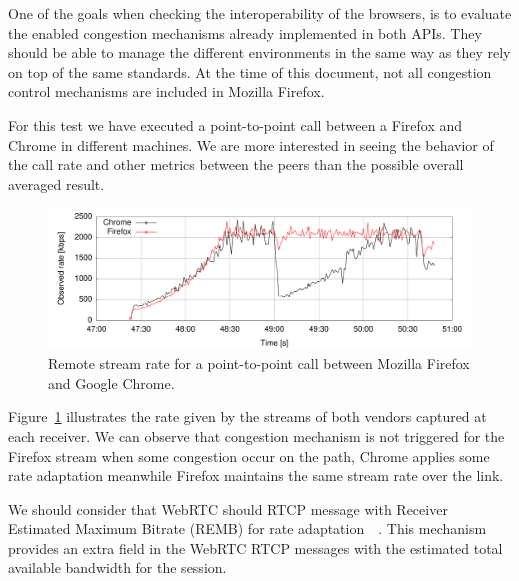 One of the goals when checking the interoperability of the browsers, is to evaluate the enabled congestion mechanisms already implemented in both APIs. They should be able to manage the different environments in the same way as they rely on top of the same standards. At the time of this document, not all congestion control mechanisms are included in Mozilla Firefox.

For this test we have executed a point-to-point call between a Firefox and Chrome in different machines. We are more interested in seeing the behavior of the call rate and other metrics between the peers than the possible overall averaged result.

\begin{figure}[h]
  \centering
    \includegraphics[width=1\textwidth]{./figures/firefoxvschrome1.pdf}
      \caption[Remote stream rate for a point-to-point call between Mozilla Firefox and Google Chrome]{Remote stream rate for a point-to-point call between Mozilla Firefox and Google Chrome.}
	\label{fig:firefoxvschrome1}
\end{figure}

Figure~\ref{fig:firefoxvschrome1} illustrates the rate given by the streams of both vendors captured at each receiver. We can observe that congestion mechanism is not triggered for the Firefox stream when some congestion occur on the path, Chrome applies some rate adaptation meanwhile Firefox maintains the same stream rate over the link.


We should consider that WebRTC should RTCP message with Receiver Estimated Maximum Bitrate (REMB)  for rate adaptation~\cite{alvestrandCongestion2012}~\cite{alvestrandCongestionREMB}. This mechanism provides an extra field in the WebRTC RTCP messages with the estimated total available bandwidth for the session. 

